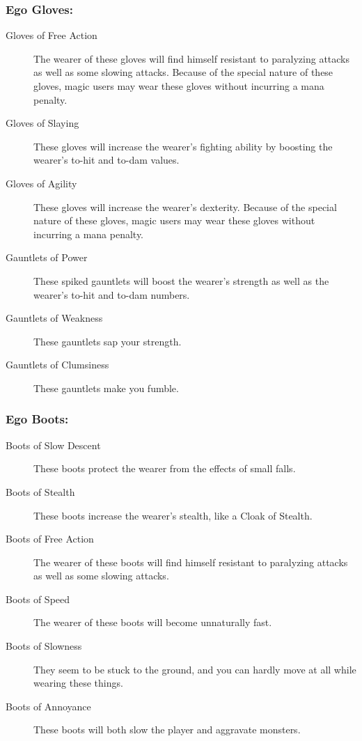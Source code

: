 \subsubsection{Ego Gloves:}
\begin{description}
\item[Gloves of Free Action]
     The wearer of these gloves will find himself resistant to paralyzing
     attacks as well as some slowing attacks. Because of the special
     nature of these gloves, magic users may wear these gloves without
     incurring a mana penalty.

\item[Gloves of Slaying]
     These gloves will increase the wearer's fighting ability by boosting
     the wearer's to-hit and to-dam values.

\item[Gloves of Agility]
     These gloves will increase the wearer's dexterity. Because of the
     special nature of these gloves, magic users may wear these gloves
     without incurring a mana penalty.

\item[Gauntlets of Power]
     These spiked gauntlets will boost the wearer's strength as well as the
     wearer's to-hit and to-dam numbers.

\item[Gauntlets of Weakness]
     These gauntlets sap your strength.

\item[Gauntlets of Clumsiness]
     These gauntlets make you fumble.
\end{description}

\subsubsection{Ego Boots:}
\begin{description}
\item[Boots of Slow Descent] These boots protect the wearer from the
effects of small falls.

\item[Boots of Stealth] These boots increase the wearer's stealth, like
a Cloak of Stealth.

\item[Boots of Free Action] The wearer of these boots will find himself
resistant to paralyzing attacks as well as some slowing attacks.

\item[Boots of Speed] The wearer of these boots will become unnaturally
fast.

\item[Boots of Slowness] They seem to be stuck to the ground, and you
can hardly move at all while wearing these things.

\item[Boots of Annoyance] These boots will both slow the player and
aggravate monsters.
\end{description}

